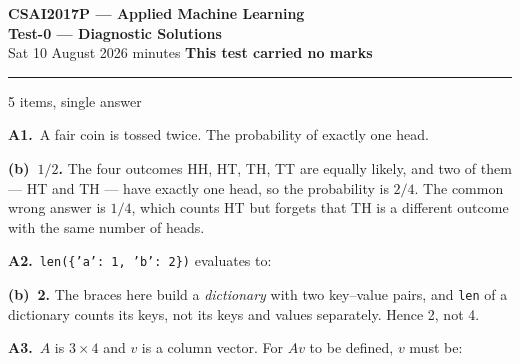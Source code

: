 \documentclass[10pt,a4paper]{article}
\newcommand{\parthead}[2]{\vspace{2pt}\noindent\rule{\linewidth}{0.4pt}\par\vspace{2pt}%
  \noindent{\bfseries Block #1}\hfill{\small #2}\par\vspace{1pt}}
\newcommand{\sol}[1]{\textbf{#1}}
\begin{document}
\begin{center}
{\large\bfseries CSAI2017P --- Applied Machine Learning}\\[2pt]
{\large\bfseries Test-0 --- Diagnostic \quad\textbullet\quad Solutions}\\[3pt]
{\small Sat 10 August 2026 \quad\textbullet{} minutes \quad\textbullet\quad \textbf{This test carried no marks}}
\end{center}
\vspace{2pt}

\noindent{}
\vspace{4pt}

\parthead{A --- Warm-up}{5 items, single answer}

\textbf{A1.}\ A fair coin is tossed twice. The probability of exactly one head.

\sol{(b)\ $1/2$.} The four outcomes HH, HT, TH, TT are equally likely, and two of them --- HT and TH ---
have exactly one head, so the probability is $2/4$. The common wrong answer is $1/4$, which counts HT
but forgets that TH is a different outcome with the same number of heads.

\vspace{5pt}

\textbf{A2.}\ \texttt{len(\{'a': 1, 'b': 2\})} evaluates to:

\sol{(b)\ 2.} The braces here build a \emph{dictionary} with two key--value pairs, and \texttt{len} of a
dictionary counts its keys, not its keys and values separately. Hence 2, not 4.

\vspace{5pt}

\textbf{A3.}\ $A$ is $3 \times 4$ and $v$ is a column vector. For $Av$ to be defined, $v$ must be:
\end{document}
